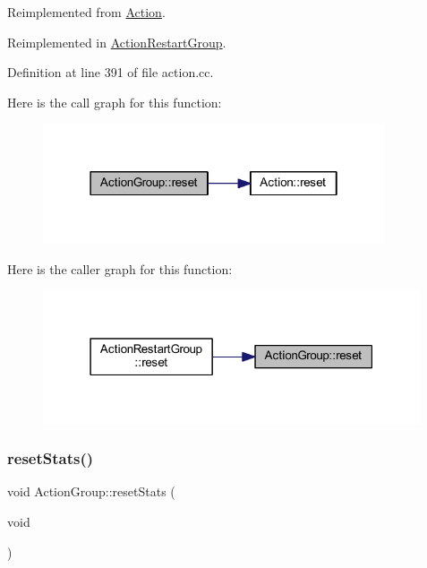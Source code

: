 Reimplemented from \mbox{\hyperlink{class_action_ac7c1cf16bb63e0741ba16be5179cf943}{Action}}.



Reimplemented in \mbox{\hyperlink{class_action_restart_group_a8a48151026811fbe97f4aa3eecf67cf0}{Action\+Restart\+Group}}.



Definition at line 391 of file action.\+cc.

Here is the call graph for this function\+:
\nopagebreak
\begin{figure}[H]
\begin{center}
\leavevmode
\includegraphics[width=286pt]{class_action_group_ae5f0c78e136f9bb5b9bcd6256b8ad097_cgraph}
\end{center}
\end{figure}
Here is the caller graph for this function\+:
\nopagebreak
\begin{figure}[H]
\begin{center}
\leavevmode
\includegraphics[width=316pt]{class_action_group_ae5f0c78e136f9bb5b9bcd6256b8ad097_icgraph}
\end{center}
\end{figure}
\mbox{\label{class_action_group_a536ed9307295585894a5f083415f2f77}} 
\subsubsection{\texorpdfstring{resetStats()}{resetStats()}}
{\footnotesize\ttfamily void Action\+Group\+::reset\+Stats (\begin{DoxyParamCaption}\item[{void}]{ }\end{DoxyParamCaption})\hspace{0.3cm}{\ttfamily [virtual]}}



